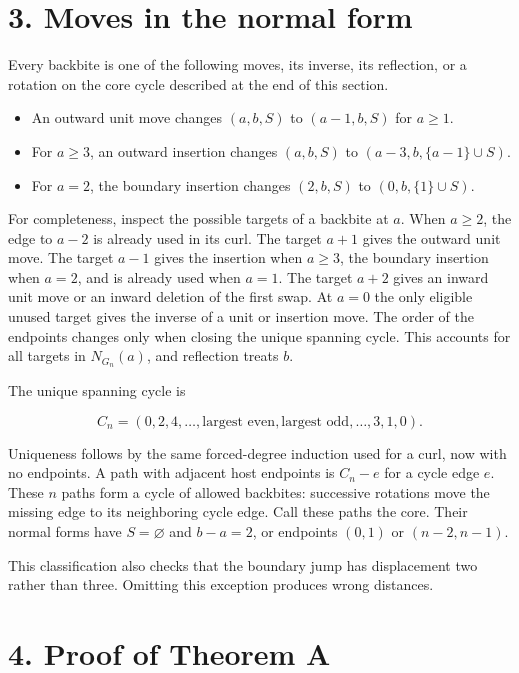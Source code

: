 \documentclass[11pt,a4paper]{article}
\providecommand{\tightlist}{\setlength{\itemsep}{0pt}\setlength{\parskip}{0pt}}
\begin{document}
\hypertarget{moves-in-the-normal-form}{%
\section{3. Moves in the normal form}\label{moves-in-the-normal-form}}

Every backbite is one of the following moves, its inverse, its reflection, or a rotation on the core cycle described at the end of this section.

\begin{itemize}
\tightlist
\item
  An outward unit move changes \((a,b,S)\) to \((a-1,b,S)\) for \(a\ge1\).
\item
  For \(a\ge3\), an outward insertion changes \((a,b,S)\) to \((a-3,b,\{a-1\}\cup S)\).
\item
  For \(a=2\), the boundary insertion changes \((2,b,S)\) to \((0,b,\{1\}\cup S)\).
\end{itemize}

For completeness, inspect the possible targets of a backbite at \(a\). When \(a\ge2\), the edge to \(a-2\) is already used in its curl. The target \(a+1\) gives the outward unit move. The target \(a-1\) gives the insertion when \(a\ge3\), the boundary insertion when \(a=2\), and is already used when \(a=1\). The target \(a+2\) gives an inward unit move or an inward deletion of the first swap. At \(a=0\) the only eligible unused target gives the inverse of a unit or insertion move. The order of the endpoints changes only when closing the unique spanning cycle. This accounts for all targets in \(N_{G_n}(a)\), and reflection treats \(b\).

The unique spanning cycle is

\[ C_n=(0,2,4,\ldots,\text{largest even},
\text{largest odd},\ldots,3,1,0). \]

Uniqueness follows by the same forced-degree induction used for a curl, now with no endpoints. A path with adjacent host endpoints is \(C_n-e\) for a cycle edge \(e\). These \(n\) paths form a cycle of allowed backbites: successive rotations move the missing edge to its neighboring cycle edge. Call these paths the core. Their normal forms have \(S=\varnothing\) and \(b-a=2\), or endpoints \((0,1)\) or \((n-2,n-1)\).

This classification also checks that the boundary jump has displacement two rather than three. Omitting this exception produces wrong distances.

\hypertarget{proof-of-theorem-a}{%
\section{4. Proof of Theorem A}\label{proof-of-theorem-a}}
\end{document}
